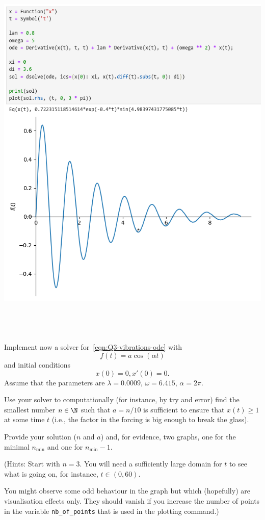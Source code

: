 \documentclass[a4paper]{article}
\begin{document}
\includegraphics[scale=0.6]{Q3-a}

\subsection{~} %

\begin{questionbody}
Implement now a solver for~\eqref{eqn:Q3-vibrations-ode} with \[
f(t) = a \cos(\alpha t)
\] and initial conditions \[
x(0) = 0, x'(0) = 0.
\] Assume that the parameters are $\lambda = 0.0009$, $\omega = 6.415$, $\alpha = 2\pi$.

Use your solver to computationally (for instance, by try and error) find the smallest number $n \in \N$ such that $a = n/10$ is sufficient to ensure that $x(t) \ge 1$ at some time $t$ (i.e., the factor in the forcing is big enough to break the glass).

Provide your solution ($n$ and $a$) and, for evidence, two graphs, one for the minimal $n_\text{min}$ and one for $n_\text{min} - 1$.

(Hints: Start with $n = 3$. You will need a sufficiently large domain for $t$ to see what is going on, for instance, $t \in (0, 60)$.

You might observe some odd behaviour in the graph but which (hopefully) are visualisation effects only. They should vanish if you increase the number of points in the variable \texttt{nb\_of\_points} that is used in the plotting command.)
\end{questionbody}
\end{document}
